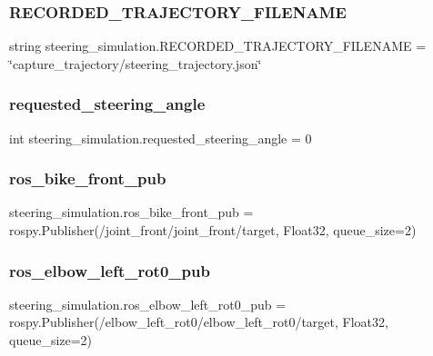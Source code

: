 \subsubsection{\texorpdfstring{RECORDED\_TRAJECTORY\_FILENAME}{RECORDED\_TRAJECTORY\_FILENAME}}
{\footnotesize\ttfamily string steering\+\_\+simulation.\+R\+E\+C\+O\+R\+D\+E\+D\+\_\+\+T\+R\+A\+J\+E\+C\+T\+O\+R\+Y\+\_\+\+F\+I\+L\+E\+N\+A\+ME = \char`\"{}capture\+\_\+trajectory/steering\+\_\+trajectory.\+json\char`\"{}}

\mbox{\label{namespacesteering__simulation_a1906425964226a8e34fc3f159b4d54fb}} 
\subsubsection{\texorpdfstring{requested\_steering\_angle}{requested\_steering\_angle}}
{\footnotesize\ttfamily int steering\+\_\+simulation.\+requested\+\_\+steering\+\_\+angle = 0}

\mbox{\label{namespacesteering__simulation_a2f98d3e960637df34f895f4ccee97bbe}} 
\subsubsection{\texorpdfstring{ros\_bike\_front\_pub}{ros\_bike\_front\_pub}}
{\footnotesize\ttfamily steering\+\_\+simulation.\+ros\+\_\+bike\+\_\+front\+\_\+pub = rospy.\+Publisher(\textquotesingle{}/joint\+\_\+front/joint\+\_\+front/target\textquotesingle{}, Float32, queue\+\_\+size=2)}

\mbox{\label{namespacesteering__simulation_a3e18ade3c9e741db3cd48035d7d11b43}} 
\subsubsection{\texorpdfstring{ros\_elbow\_left\_rot0\_pub}{ros\_elbow\_left\_rot0\_pub}}
{\footnotesize\ttfamily steering\+\_\+simulation.\+ros\+\_\+elbow\+\_\+left\+\_\+rot0\+\_\+pub = rospy.\+Publisher(\textquotesingle{}/elbow\+\_\+left\+\_\+rot0/elbow\+\_\+left\+\_\+rot0/target\textquotesingle{}, Float32, queue\+\_\+size=2)}

